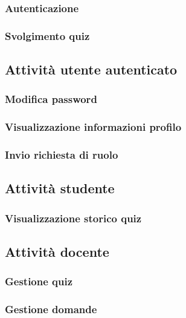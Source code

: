 \documentclass[a4paper, titlepage]{article}
\begin{document}
\subsubsection{Autenticazione}

\subsubsection{Svolgimento quiz}

\subsection{Attività utente autenticato}

\subsubsection{Modifica password}

\subsubsection{Visualizzazione informazioni profilo}

\subsubsection{Invio richiesta di ruolo}

\subsection{Attività studente}

\subsubsection{Visualizzazione storico quiz}

\subsection{Attività docente}

\subsubsection{Gestione quiz}



\subsubsection{Gestione domande}
\end{document}

